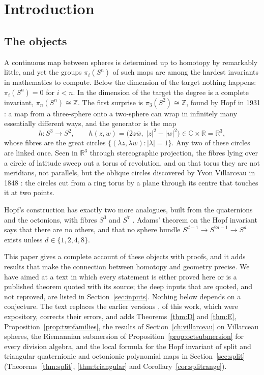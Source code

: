 \documentclass[11pt]{amsart}
\numberwithin{equation}{section}
\theoremstyle{plain}
\theoremstyle{definition}
\theoremstyle{remark}
\newcommand{\R}{\mathbb{R}}
\newcommand{\C}{\mathbb{C}}
\newcommand{\Z}{\mathbb{Z}}
\begin{document}
\maketitle

\section{Introduction}\label{ch:intro}

\subsection{The objects}

A continuous map between spheres is determined up to homotopy by remarkably little, and yet the groups $\pi_i(S^n)$ of such maps are among the hardest invariants in mathematics to compute. Below the dimension of the target nothing happens: $\pi_i(S^n)=0$ for $i<n$. In the dimension of the target the degree is a complete invariant, $\pi_n(S^n)\cong\Z$. The first surprise is $\pi_3(S^2)\cong\Z$, found by Hopf in 1931 \cite{Hop31}: a map from a three-sphere onto a two-sphere can wrap in infinitely many essentially different ways, and the generator is the map
\begin{equation}\label{eq:intro-hopf}
h\colon S^3\to S^2,\qquad h(z,w)=\bigl(2z\bar w,\;|z|^2-|w|^2\bigr)\in\C\times\R=\R^3 ,
\end{equation}
whose fibres are the great circles $\{(\lambda z,\lambda w):|\lambda|=1\}$. Any two of these circles are linked once. Seen in $\R^3$ through stereographic projection, the fibres lying over a circle of latitude sweep out a torus of revolution, and on that torus they are not meridians, not parallels, but the oblique circles discovered by Yvon Villarceau in 1848 \cite{Vil48}: the circles cut from a ring torus by a plane through its centre that touches it at two points.

Hopf's construction has exactly two more analogues, built from the quaternions and the octonions, with fibres $S^3$ and $S^7$ \cite{Hop35}. Adams' theorem on the Hopf invariant \cite{Ada60} says that there are no others, and that no sphere bundle $S^{d-1}\to S^{2d-1}\to S^d$ exists unless $d\in\{1,2,4,8\}$.

This paper gives a complete account of these objects with proofs, and it adds results that make the connection between homotopy and geometry precise. We have aimed at a text in which every statement is either proved here or is a published theorem quoted with its source; the deep inputs that are quoted, and not reproved, are listed in Section~\ref{sec:inputs}. Nothing below depends on a conjecture. The text replaces the earlier versions \cite{BSS22}, \cite{Bha26a} of this work, which were expository, corrects their errors, and adds Theorems~\ref{thm:D} and \ref{thm:E}, Proposition~\ref{prop:twofamilies}, the results of Section~\ref{ch:villarceau} on Villarceau spheres, the Riemannian submersion of Proposition~\ref{prop:octsubmersion} for every division algebra, and the local formula for the Hopf invariant of split and triangular quaternionic and octonionic polynomial maps in Section~\ref{sec:split} (Theorems~\ref{thm:split}, \ref{thm:triangular} and Corollary~\ref{cor:splitrange}).
\end{document}
